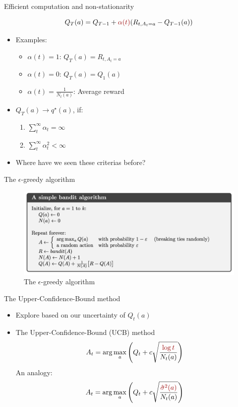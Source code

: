 \documentclass[10pt]{beamer}
\begin{document}
\begin{frame}{Efficient computation and non-stationarity}

\[
Q_T(a) = Q_{T-1} + {\color{uured} \alpha(t)} (R_{t, A_t=a} - Q_{T-1}(a))
\]
\begin{itemize}
\item Examples:
\begin{itemize}
\item $\alpha(t) = 1$: $Q_T(a) = R_{t,A_t=a}$\pause
\item $\alpha(t) = 0$: $Q_T(a) = Q_{1}(a)$\pause
\item $\alpha(t) = \frac{1}{N_t(a)}$: Average reward\pause
\end{itemize}
\item $Q_T(a) \rightarrow q^\star(a)$, if:\pause
\begin{enumerate}
\item $\sum^\infty_t \alpha_t = \infty$
\item $\sum^\infty_t \alpha^2_t < \infty$
\end{enumerate}
\item Where have we seen these criterias before?
\end{itemize}

\end{frame}

\begin{frame}{The $\epsilon$-greedy algorithm}

\begin{figure}[h]
\centering
\includegraphics[width=1\textwidth]{fig/sutton_bandit.png}
\caption{The $\epsilon$-greedy algorithm}
\end{figure}

\end{frame}



\begin{frame}{The Upper-Confidence-Bound method}

\begin{itemize}
\item Explore based on our uncertainty of $Q_t(a)$\pause
\item The Upper-Confidence-Bound (UCB) method
\[
A_t = \arg \max_a \left( Q_{t} + c \sqrt{\frac{{\color{uured} \log t}}{N_t(a)}}  \right)
\]
An analogy:
\[
A_t = \arg \max_a \left( Q_{t} + c \sqrt{\frac{{\color{uured}\hat{\sigma}^2(a)}}{N_t(a)}} \right)
\]
\end{itemize}

\end{frame}
\end{document}
